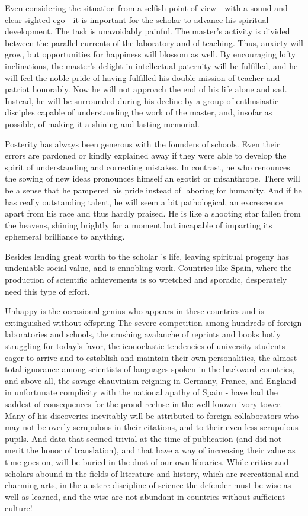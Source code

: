 \documentclass{article}
\begin{document}
Even considering the situation from a selfish point of view - with a sound and clear-sighted ego - it is important for the scholar to advance his spiritual development. The task is unavoidably painful. The master’s activity is divided between the parallel currents of the laboratory and of teaching. Thus, anxiety will grow, but opportunities for happiness will blossom as well. By encouraging lofty inclinations, the master’s delight in intellectual paternity will be fulfilled, and he will feel the noble pride of having fulfilled his double mission of teacher and patriot honorably. Now he will not approach the end of his life alone and sad. Instead, he will be surrounded during his decline by a group of enthusiastic disciples capable of understanding the work of the master, and, insofar as possible, of making it a shining and lasting memorial.

Posterity has always been generous with the founders of schools. Even their errors are pardoned or kindly explained away if they were able to develop the spirit of understanding and correcting mistakes. In contrast, he who renounces the sowing of new ideas pronounces himself an egotist or misanthrope. There will be a sense that he pampered his pride instead of laboring for humanity. And if he has really outstanding talent, he will seem a bit pathological, an excrescence apart from his race and thus hardly praised. He is like a shooting star fallen from the heavens, shining brightly for a moment but incapable of imparting its ephemeral brilliance to anything.

Besides lending great worth to the scholar ’s life, leaving spiritual progeny has undeniable social value, and is ennobling work. Countries like Spain, where the production of scientific achievements is so wretched and sporadic, desperately need this type of effort.

Unhappy is the occasional genius who appears in these countries and is extinguished without offspring\! The severe competition among hundreds of foreign laboratories and schools, the crushing avalanche of reprints and books hotly struggling for today’s favor, the iconoclastic tendencies of university students eager to arrive and to establish and maintain their own personalities, the almost total ignorance among scientists of languages spoken in the backward countries, and above all, the savage chauvinism reigning in Germany, France, and England - in unfortunate complicity with the national apathy of Spain - have had the saddest of consequences for the proud recluse in the well-known ivory tower. Many of his discoveries inevitably will be attributed to foreign collaborators who may not be overly scrupulous in their citations, and to their even less scrupulous pupils. And data that seemed trivial at the time of publication (and did not merit the honor of translation), and that have a way of increasing their value as time goes on, will be buried in the dust of our own libraries. While critics and scholars abound in the fields of literature and history, which are recreational and charming arts, in the austere discipline of science the defender must be wise as well as learned, and the wise are not abundant in countries without sufficient culture!
\end{document}
